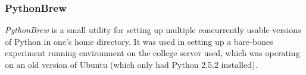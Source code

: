 \documentclass[a4paper,11pt]{report}
\begin{document}
\subsubsection*{PythonBrew}
\emph{PythonBrew} \citep{prog:pythonbrew} is a small utility for setting up multiple concurrently usable versions of Python in one's home directory. It was used in setting up a bare-bones experiment running environment on the college server used, which was operating on an old version of Ubuntu (which only had Python 2.5.2 installed).





\end{document}
